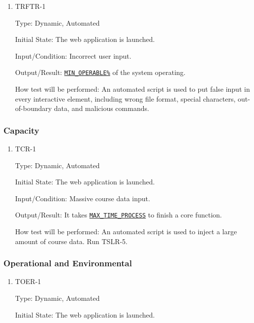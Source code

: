 \documentclass[12pt, titlepage]{article}
\begin{document}
\begin{enumerate}
\begin{enumerate}
\item{TRFTR-1\\}\label{TRFTR-1}

Type: Dynamic, Automated
					
Initial State: The web application is launched.
					
Input/Condition: Incorrect user input.
					
Output/Result: \hyperref[MIN_OPERABLE]{\texttt{MIN\_OPERABLE\%}} of the system operating.
					
How test will be performed: An automated script is used to put false input in every interactive element, including wrong file format, special characters, out-of-boundary data, and malicious commands.
\end{enumerate}
\subsubsection{Capacity}

\begin{enumerate}

\item{TCR-1\\}\label{TCR-2}

Type: Dynamic, Automated
					
Initial State: The web application is launched.
					
Input/Condition: Massive course data input.
					
Output/Result: It takes \hyperref[MAX_TIME_PROCESS]{\texttt{MAX\_TIME\_PROCESS}} to finish a core function.
					
How test will be performed: An automated script is used to inject a large amount of course data.  Run TSLR-5.

\end{enumerate}

\subsubsection{Operational  and Environmental}

\begin{enumerate}
\item{TOER-1\\}\label{TOER-1}

Type: Dynamic, Automated
					
Initial State: The web application is launched.
					

\end{enumerate}
\end{enumerate}
\end{document}
